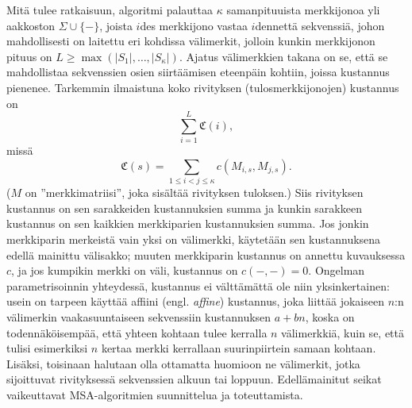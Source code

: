 \documentclass[finnish]{tktltiki2}
\theoremstyle{definition}
\theoremstyle{remark}
\begin{document}
Mitä tulee ratkaisuun, algoritmi palauttaa $\kappa$ samanpituuista merkkijonoa yli aakkoston $\Sigma \cup \{ - \}$, joista $i$des merkkijono vastaa $i$dennettä sekvenssiä, johon mahdollisesti on laitettu eri kohdissa välimerkit, jolloin kunkin merkkijonon pituus on $L \geq \max(|S_1|, \dots, |S_\kappa|)$. Ajatus välimerkkien takana on se, että se mahdollistaa sekvenssien osien siirtäämisen eteenpäin kohtiin, joissa kustannus pienenee. Tarkemmin ilmaistuna koko rivityksen (tulosmerkkijonojen) kustannus on
\[
\sum_{i = 1}^L \mathfrak{C}(i),
\]
missä 
\[
\mathfrak{C}(s) = \sum_{1 \leq i < j \leq \kappa} c(M_{i, s}, M_{j, s}).
\]
($M$ on ''merkkimatriisi'', joka sisältää rivityksen tuloksen.) Siis rivityksen kustannus on sen sarakkeiden kustannuksien summa ja kunkin sarakkeen kustannus on sen kaikkien merkkiparien kustannuksien summa. Jos jonkin merkkiparin merkeistä vain yksi on välimerkki, käytetään sen kustannuksena edellä mainittu välisakko; muuten merkkiparin kustannus on annettu kuvauksessa $c$, ja jos kumpikin merkki on väli, kustannus on $c(-,-) = 0$. Ongelman parametrisoinnin yhteydessä, kustannus ei välttämättä ole niin yksinkertainen: usein on tarpeen käyttää affiini (engl. \textit{affine}) kustannus, joka liittää jokaiseen $n$:n välimerkin vaakasuuntaiseen sekvenssiin  kustannuksen $a + bn$, koska on todennäköisempää, että yhteen kohtaan tulee kerralla $n$ välimerkkiä, kuin se, että tulisi esimerkiksi $n$ kertaa merkki kerrallaan suurinpiirtein samaan kohtaan. Lisäksi, toisinaan halutaan olla ottamatta huomioon ne välimerkit, jotka sijoittuvat rivityksessä sekvenssien alkuun tai loppuun. Edellämainitut seikat vaikeuttavat MSA-algoritmien suunnittelua ja toteuttamista.
 
\end{document}

